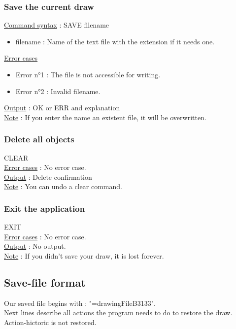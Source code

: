 \documentclass[a4paper, 12pts]{article}
\begin{document}
		\subsubsection{Save the current draw}
			\uline{Command syntax} :
			SAVE filename
			\begin{itemize}
				\item filename : Name of the text file with the extension if it needs one.
			\end{itemize}
			\uline{Error cases}
			\begin{itemize}
				\item Error n°1 : The file is not accessible for writing.
				\item Error n°2 : Invalid filename.
			\end{itemize}
			\uline{Output} : OK or ERR and explanation\\
			\uline{Note} : 
			If you enter the name an existent file, it will be overwritten.

		\subsubsection{Delete all objects}
			CLEAR\\
			\uline{Error cases} : No error case.\\
			\uline{Output} : Delete confirmation\\
			\uline{Note} : 
			You can undo a clear command.

		\subsubsection{Exit the application}
			EXIT\\
			\uline{Error cases} : No error case.\\
			\uline{Output} : No output.\\
			\uline{Note} : 
			If you didn't save your draw, it is lost forever.

		
	\subsection{Save-file format}
		Our saved file begins with : "=drawingFileB3133".\\
		Next lines describe all actions the program needs to do to restore the draw.\\
		Action-hictoric is not restored.
\end{document}
